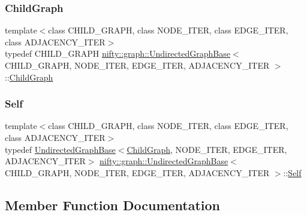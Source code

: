 \subsubsection{\texorpdfstring{Child\+Graph}{ChildGraph}}
{\footnotesize\ttfamily template$<$class C\+H\+I\+L\+D\+\_\+\+G\+R\+A\+PH, class N\+O\+D\+E\+\_\+\+I\+T\+ER, class E\+D\+G\+E\+\_\+\+I\+T\+ER, class A\+D\+J\+A\+C\+E\+N\+C\+Y\+\_\+\+I\+T\+ER$>$ \\
typedef C\+H\+I\+L\+D\+\_\+\+G\+R\+A\+PH \hyperlink{classnifty_1_1graph_1_1UndirectedGraphBase}{nifty\+::graph\+::\+Undirected\+Graph\+Base}$<$ C\+H\+I\+L\+D\+\_\+\+G\+R\+A\+PH, N\+O\+D\+E\+\_\+\+I\+T\+ER, E\+D\+G\+E\+\_\+\+I\+T\+ER, A\+D\+J\+A\+C\+E\+N\+C\+Y\+\_\+\+I\+T\+ER $>$\+::\hyperlink{classnifty_1_1graph_1_1UndirectedGraphBase_af2541cf9fb91440ff0a7b56dd5a6be29}{Child\+Graph}}

\mbox{\label{classnifty_1_1graph_1_1UndirectedGraphBase_a3a637f240a8d05794be99e5f290a71b9}} 
\subsubsection{\texorpdfstring{Self}{Self}}
{\footnotesize\ttfamily template$<$class C\+H\+I\+L\+D\+\_\+\+G\+R\+A\+PH, class N\+O\+D\+E\+\_\+\+I\+T\+ER, class E\+D\+G\+E\+\_\+\+I\+T\+ER, class A\+D\+J\+A\+C\+E\+N\+C\+Y\+\_\+\+I\+T\+ER$>$ \\
typedef \hyperlink{classnifty_1_1graph_1_1UndirectedGraphBase}{Undirected\+Graph\+Base}$<$\hyperlink{classnifty_1_1graph_1_1UndirectedGraphBase_af2541cf9fb91440ff0a7b56dd5a6be29}{Child\+Graph}, N\+O\+D\+E\+\_\+\+I\+T\+ER, E\+D\+G\+E\+\_\+\+I\+T\+ER, A\+D\+J\+A\+C\+E\+N\+C\+Y\+\_\+\+I\+T\+ER$>$ \hyperlink{classnifty_1_1graph_1_1UndirectedGraphBase}{nifty\+::graph\+::\+Undirected\+Graph\+Base}$<$ C\+H\+I\+L\+D\+\_\+\+G\+R\+A\+PH, N\+O\+D\+E\+\_\+\+I\+T\+ER, E\+D\+G\+E\+\_\+\+I\+T\+ER, A\+D\+J\+A\+C\+E\+N\+C\+Y\+\_\+\+I\+T\+ER $>$\+::\hyperlink{classnifty_1_1graph_1_1UndirectedGraphBase_a3a637f240a8d05794be99e5f290a71b9}{Self}}



\subsection{Member Function Documentation}
\mbox{\label{classnifty_1_1graph_1_1UndirectedGraphBase_a46eb06d4cd54189ba6b992735494b788}} 
